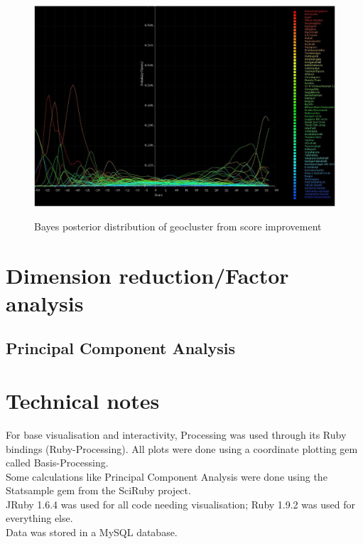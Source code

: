 \documentclass[10pt]{article}
\begin{document}
\begin{figure}
\caption{Bayes posterior distribution of geocluster from score improvement}
\label{BayesClusterFromImprovement}
\begin{center}
\includegraphics[width=160mm]{ReportMedia/BayesClusterFromImprovement.jpg}\\
\end{center}
\end{figure}
\newpage
\section{Dimension reduction/Factor analysis}
\subsection{Principal Component Analysis}

\newpage
\section{Technical notes}
For base visualisation and interactivity, Processing was used through its Ruby bindings (Ruby-Processing). All plots were done using a coordinate plotting gem called Basis-Processing.\\
Some calculations like Principal Component Analysis were done using the Statsample gem from the SciRuby project.\\
JRuby 1.6.4 was used for all code needing visualisation; Ruby 1.9.2 was used for everything else.\\
Data was stored in a MySQL database.
\end{document}
